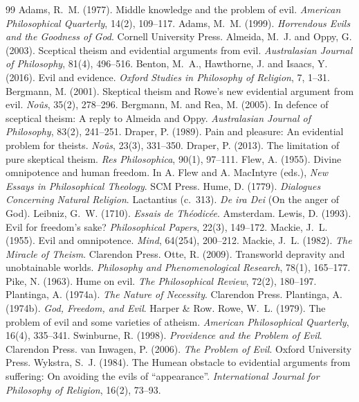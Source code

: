 \documentclass{situationist-preprint}
\begin{document}
\begin{thebibliography}{99}\small
{} Adams, R.~M. (1977). Middle knowledge and the problem of evil. \emph{American Philosophical Quarterly}, 14(2), 109--117.
 Adams, M.~M. (1999). \emph{Horrendous Evils and the Goodness of God}. Cornell University Press.
 Almeida, M.~J. and Oppy, G. (2003). Sceptical theism and evidential arguments from evil. \emph{Australasian Journal of Philosophy}, 81(4), 496--516.
 Benton, M.~A., Hawthorne, J. and Isaacs, Y. (2016). Evil and evidence. \emph{Oxford Studies in Philosophy of Religion}, 7, 1--31.
 Bergmann, M. (2001). Skeptical theism and Rowe's new evidential argument from evil. \emph{No\^us}, 35(2), 278--296.
 Bergmann, M. and Rea, M. (2005). In defence of sceptical theism: A reply to Almeida and Oppy. \emph{Australasian Journal of Philosophy}, 83(2), 241--251.
 Draper, P. (1989). Pain and pleasure: An evidential problem for theists. \emph{No\^us}, 23(3), 331--350.
 Draper, P. (2013). The limitation of pure skeptical theism. \emph{Res Philosophica}, 90(1), 97--111.
 Flew, A. (1955). Divine omnipotence and human freedom. In A. Flew and A. MacIntyre (eds.), \emph{New Essays in Philosophical Theology}. SCM Press.
 Hume, D. (1779). \emph{Dialogues Concerning Natural Religion}.
 Lactantius (c.~313). \emph{De ira Dei} (On the anger of God).
 Leibniz, G.~W. (1710). \emph{Essais de Th\'eodic\'ee}. Amsterdam.
 Lewis, D. (1993). Evil for freedom's sake? \emph{Philosophical Papers}, 22(3), 149--172.
 Mackie, J.~L. (1955). Evil and omnipotence. \emph{Mind}, 64(254), 200--212.
 Mackie, J.~L. (1982). \emph{The Miracle of Theism}. Clarendon Press.
 Otte, R. (2009). Transworld depravity and unobtainable worlds. \emph{Philosophy and Phenomenological Research}, 78(1), 165--177.
 Pike, N. (1963). Hume on evil. \emph{The Philosophical Review}, 72(2), 180--197.
 Plantinga, A. (1974a). \emph{The Nature of Necessity}. Clarendon Press.
 Plantinga, A. (1974b). \emph{God, Freedom, and Evil}. Harper \& Row.
 Rowe, W.~L. (1979). The problem of evil and some varieties of atheism. \emph{American Philosophical Quarterly}, 16(4), 335--341.
 Swinburne, R. (1998). \emph{Providence and the Problem of Evil}. Clarendon Press.
 van Inwagen, P. (2006). \emph{The Problem of Evil}. Oxford University Press.
 Wykstra, S.~J. (1984). The Humean obstacle to evidential arguments from suffering: On avoiding the evils of \enquote{appearance}. \emph{International Journal for Philosophy of Religion}, 16(2), 73--93.
\end{thebibliography}
\end{document}
